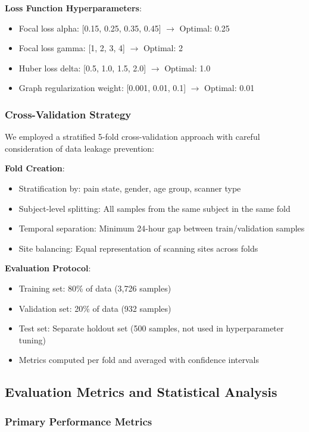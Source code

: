\documentclass[10pt,journal,compsoc]{IEEEtran}
\begin{document}
\textbf{Loss Function Hyperparameters}:
\begin{itemize}
\item Focal loss alpha: [0.15, 0.25, 0.35, 0.45] $\rightarrow$ Optimal: 0.25
\item Focal loss gamma: [1, 2, 3, 4] $\rightarrow$ Optimal: 2
\item Huber loss delta: [0.5, 1.0, 1.5, 2.0] $\rightarrow$ Optimal: 1.0
\item Graph regularization weight: [0.001, 0.01, 0.1] $\rightarrow$ Optimal: 0.01
\end{itemize}

\subsubsection{Cross-Validation Strategy}

We employed a stratified 5-fold cross-validation approach with careful consideration of data leakage prevention:

\textbf{Fold Creation}:
\begin{itemize}
\item Stratification by: pain state, gender, age group, scanner type
\item Subject-level splitting: All samples from the same subject in the same fold
\item Temporal separation: Minimum 24-hour gap between train/validation samples
\item Site balancing: Equal representation of scanning sites across folds
\end{itemize}

\textbf{Evaluation Protocol}:
\begin{itemize}
\item Training set: 80\% of data (3,726 samples)
\item Validation set: 20\% of data (932 samples)
\item Test set: Separate holdout set (500 samples, not used in hyperparameter tuning)
\item Metrics computed per fold and averaged with confidence intervals
\end{itemize}

\subsection{Evaluation Metrics and Statistical Analysis}

\subsubsection{Primary Performance Metrics}
\end{document}
